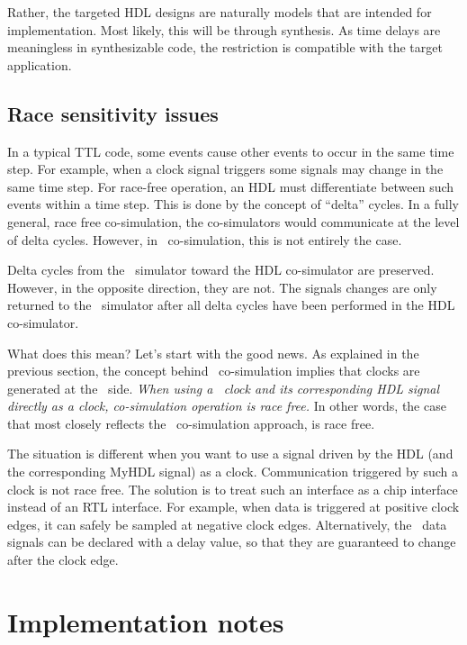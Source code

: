 Rather, the targeted HDL designs are naturally models that are
intended for implementation.  Most likely, this will be through
synthesis. As time delays are meaningless in synthesizable code, the
restriction is compatible with the target application.

\subsection{Race sensitivity issues}

In a typical TTL code, some events cause other events to occur in the
same time step. For example, when a clock signal triggers some signals
may change in the same time step. For race-free operation, an HDL
must differentiate between such events within a time step. This is done
by the concept of ``delta'' cycles. In a fully general, race free
co-simulation, the co-simulators would communicate at the level of delta
cycles. However, in \myhdl\ co-simulation, this is not entirely the
case.

Delta cycles from the \myhdl\ simulator toward the HDL co-simulator are
preserved. However, in the opposite direction, they are not. The
signals changes are only returned to the \myhdl\ simulator after all delta
cycles have been performed in the HDL co-simulator.

What does this mean? Let's start with the good news. As explained in
the previous section, the concept behind \myhdl\ co-simulation implies
that clocks are generated at the \myhdl\ side.  \emph{When using a
\myhdl\ clock and its corresponding HDL signal directly as a clock,
co-simulation operation is race free.} In other words, the case
that most closely reflects the \myhdl\ co-simulation approach, is race free.

The situation is different when you want to use a signal driven by the
HDL (and the corresponding MyHDL signal) as a clock. 
Communication triggered by such a clock is not race free. The solution
is to treat such an interface as a chip interface instead of an RTL
interface.  For example, when data is triggered at positive clock
edges, it can safely be sampled at negative clock edges.
Alternatively, the \myhdl\ data signals can be declared with a delay
value, so that they are guaranteed to change after the clock
edge.


\section{Implementation notes}

